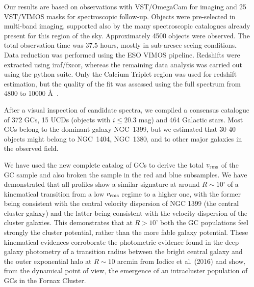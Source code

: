 \documentclass[useAMS,usenatbib]{mn2e}
\begin{document}
Our results are based on observations with VST/OmegaCam for imaging and 25 VST/VIMOS masks for spectroscopic follow-up. Objects were pre-selected in multi-band imaging, supported also by the many spectroscopic catalogues already present for this region of the sky.  Approximately 4500 objects were observed. The total observation time was 37.5 hours, mostly in sub-arcsec seeing conditions. Data reduction was performed using the ESO VIMOS pipeline. Redshifts were extracted using iraf/fxcor, whereas the remaining data analysis was carried out using the python suite. Only the Calcium Triplet region was used for redshift estimation, but the quality of the fit was assessed using the full spectrum from 4800 to 10000 \AA\ .

After a visual inspection of candidate spectra, we compiled a consensus catalogue of 372 GCs, 15 UCDs (objects with $i \le 20.3$ mag) and 464 Galactic stars. Most GCs belong to the dominant galaxy NGC~1399, but we estimated that 30-40 objects might belong to NGC~1404, NGC~1380, and to other major galaxies in the observed field.

We have used the new complete catalog of GCs to derive the total  $v_{\rm rms}$ of the GC sample and also broken the sample in the red and blue subsamples.
 We have demonstrated that all profiles show a similar signature at around $R\sim10’$ of a kinematical transition from a low $v_{\rm rms}$ regime to a higher one, with the former being consistent with the central velocity dispersion of NGC 1399 (the central cluster galaxy) and the latter being consistent with the velocity dispersion of the cluster galaxies. This demonstrates that at $R>10’$ both the GC populations feel strongly the cluster potential, rather than the more fable galaxy potential. These kinematical evidences corroborate the photometric evidence found in the deep galaxy photometry of a transition radius between the bright central galaxy and the outer exponential halo at $R\sim10$ arcmin from Iodice et al. (2016) and show, from the dynamical point of view,  the emergence of an intracluster population of GCs in the Fornax Cluster.




\end{document}
